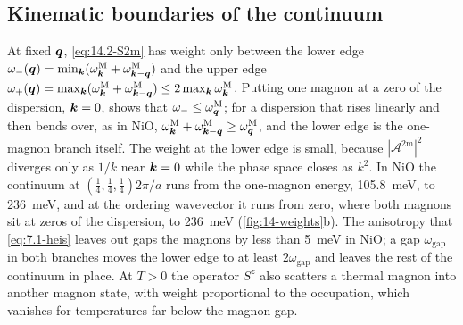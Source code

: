 \subsection{Kinematic boundaries of the continuum}\label{sec:14.2-edges}

At fixed $\bm{q}$, \cref{eq:14.2-S2m} has weight only between the lower edge $\omega_-(\bm{q}) = \min_{\bm{k}}(\omega^{\mathrm{M}}_{\bm{k}} + \omega^{\mathrm{M}}_{\bm{k}-\bm{q}})$ and the upper edge $\omega_+(\bm{q}) = \max_{\bm{k}}(\omega^{\mathrm{M}}_{\bm{k}} + \omega^{\mathrm{M}}_{\bm{k}-\bm{q}}) \le 2\max_{\bm{k}}\omega^{\mathrm{M}}_{\bm{k}}$. Putting one magnon at a zero of the dispersion, $\bm{k} = 0$, shows that $\omega_- \le \omega^{\mathrm{M}}_{\bm{q}}$; for a dispersion that rises linearly and then bends over, as in NiO, $\omega^{\mathrm{M}}_{\bm{k}} + \omega^{\mathrm{M}}_{\bm{k}-\bm{q}} \ge \omega^{\mathrm{M}}_{\bm{q}}$, and the lower edge is the one-magnon branch itself. The weight at the lower edge is small, because $|\mathcal{A}^{\mathrm{2m}}|^2$ diverges only as $1/k$ near $\bm{k} = 0$ while the phase space closes as $k^2$. In NiO the continuum at $(\frac14,\frac14,\frac14)2\pi/a$ runs from the one-magnon energy, \SI{105.8}{meV}, to \SI{236}{meV}, and at the ordering wavevector it runs from zero, where both magnons sit at zeros of the dispersion, to \SI{236}{meV} (\cref{fig:14-weights}b). The anisotropy that \cref{eq:7.1-heis} leaves out gaps the magnons by less than \SI{5}{meV} in NiO; a gap $\omega_{\mathrm{gap}}$ in both branches moves the lower edge to at least $2\omega_{\mathrm{gap}}$ and leaves the rest of the continuum in place. At $T > 0$ the operator $S^z$ also scatters a thermal magnon into another magnon state, with weight proportional to the occupation, which vanishes for temperatures far below the magnon gap.

